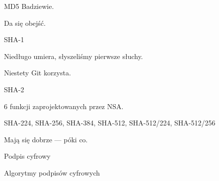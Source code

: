 \begin{frame}{MD5}
	Badziewie.
	
	Da się obejść.
\end{frame}

\begin{frame}{SHA-1}
	
	Niedługo umiera, słyszeliśmy pierwsze słuchy.
	
	Niestety Git korzysta.
	
\end{frame}

\begin{frame}{SHA-2}
	
	6 funkcji zaprojektowanych przez NSA.
	
	SHA-224, SHA-256, SHA-384, SHA-512, SHA-512/224, SHA-512/256
	
	Mają się dobrze --- póki co.
	
\end{frame}

\begin{frame}{Podpis cyfrowy}
	
\end{frame}

\begin{frame}{Algorytmy podpisów cyfrowych}
	
\end{frame}